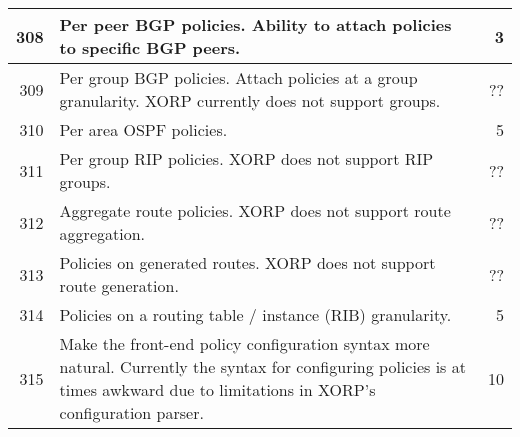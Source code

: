 \documentclass[letterpaper]{article}
\begin{document}
\begin{center}
\begin{supertabular}{|r |p{12cm} |r|}
308 &
Per peer BGP policies.  Ability to attach policies to specific BGP peers.
&
3 \\
\hline

309 &
Per group BGP policies.  Attach policies at a group granularity.  XORP currently
does not support groups.
&
?? \\
\hline

310 &
Per area OSPF policies.
&
5 \\
\hline

311 &
Per group RIP policies.  XORP does not support RIP groups.
&
?? \\
\hline

312 &
Aggregate route policies.  XORP does not support route aggregation.
&
?? \\
\hline

313 &
Policies on generated routes.  XORP does not support route generation.
&
?? \\
\hline

314 &
Policies on a routing table / instance (RIB) granularity.
&
5 \\
\hline

315 &
Make the front-end policy configuration syntax more natural.  Currently the
syntax for configuring policies is at times awkward due to limitations in XORP's
configuration parser.
& 10 \\
\hline

\end{supertabular}
\end{center}
\end{document}
